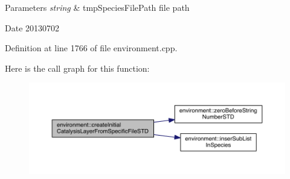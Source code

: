 \begin{DoxyParams}{Parameters}
{\em string} & tmp\-Species\-File\-Path file path \\
\hline
\end{DoxyParams}
\begin{DoxyDate}{Date}
20130702 
\end{DoxyDate}


Definition at line 1766 of file environment.\-cpp.



Here is the call graph for this function\-:
\nopagebreak
\begin{figure}[H]
\begin{center}
\leavevmode
\includegraphics[width=350pt]{a00014_a6dd31bae82367ebe7d6a6bb062b8cd07_cgraph}
\end{center}
\end{figure}


